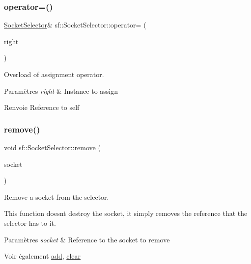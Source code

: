 \subsubsection{\texorpdfstring{operator=()}{operator=()}}
{\footnotesize\ttfamily \hyperlink{classsf_1_1SocketSelector}{Socket\+Selector}\& sf\+::\+Socket\+Selector\+::operator= (\begin{DoxyParamCaption}\item[{const \hyperlink{classsf_1_1SocketSelector}{Socket\+Selector} \&}]{right }\end{DoxyParamCaption})}



Overload of assignment operator. 


\begin{DoxyParams}{Paramètres}
{\em right} & Instance to assign\\
\hline
\end{DoxyParams}
\begin{DoxyReturn}{Renvoie}
Reference to self 
\end{DoxyReturn}
\mbox{\label{classsf_1_1SocketSelector_a98b6ab693a65b82caa375639232357c1}} 
\subsubsection{\texorpdfstring{remove()}{remove()}}
{\footnotesize\ttfamily void sf\+::\+Socket\+Selector\+::remove (\begin{DoxyParamCaption}\item[{\hyperlink{classsf_1_1Socket}{Socket} \&}]{socket }\end{DoxyParamCaption})}



Remove a socket from the selector. 

This function doesn\textquotesingle{}t destroy the socket, it simply removes the reference that the selector has to it.


\begin{DoxyParams}{Paramètres}
{\em socket} & Reference to the socket to remove\\
\hline
\end{DoxyParams}
\begin{DoxySeeAlso}{Voir également}
\hyperlink{classsf_1_1SocketSelector_ade952013232802ff7b9b33668f8d2096}{add}, \hyperlink{classsf_1_1SocketSelector_a76e650acb0199d4be91e90a493fbc91a}{clear} 
\end{DoxySeeAlso}
\mbox{\label{classsf_1_1SocketSelector_a9cfda5475f17925e65889394d70af702}} 
